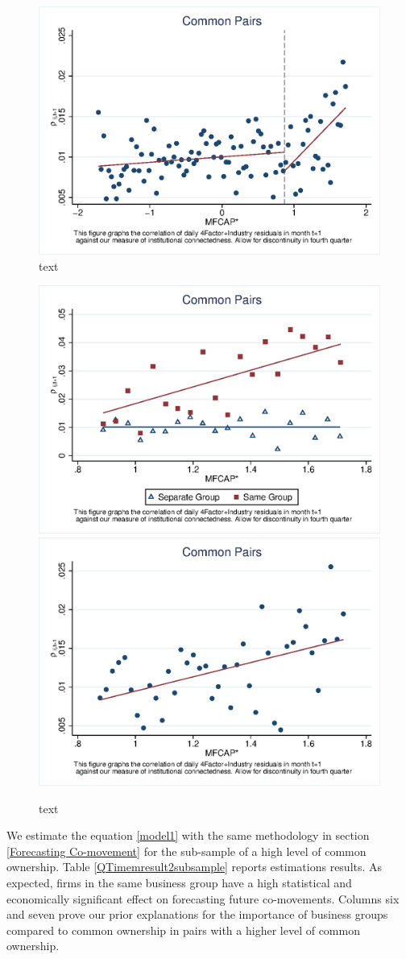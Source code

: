 \begin{LTR}
			\begin{figure}[htbp]
				\centering  
				\includegraphics[width=0.6\linewidth]{"Output/Qmcorr5lrd.eps"}
				\caption{text}
				\label{Qmcorr5lrd}
			\end{figure}
			\begin{figure}[htbp]
				\centering  
				\includegraphics[width=0.45\linewidth]{"Output/Qmcorr5lrdbgsubsample.eps"}
				\includegraphics[width=0.45\linewidth]{"Output/Qmcorr5subsample.eps"}
				\caption{text}
				\label{Qmcorr5subsample}
			\end{figure}
			
			
			We estimate the equation \ref{model1} with the same methodology in section \ref{Forecasting Co-movement}  for the sub-sample of a high level of common ownership. Table \ref{QTimemresult2subsample} reports estimations results. As expected, firms in the same business group have a high statistical and economically significant effect on forecasting future co-movements. Columns six and seven prove our prior explanations for the importance of business groups compared to common ownership in pairs with a higher level of common ownership.
			

\end{LTR}
